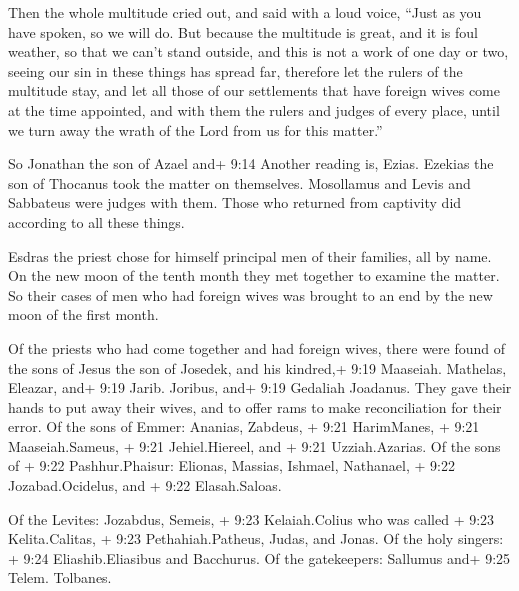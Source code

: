  Then the whole multitude cried out, and said with a loud
voice, ``Just as you have spoken, so we will do.  But
because the multitude is great, and it is foul weather, so that we can't
stand outside, and this is not a work of one day or two, seeing our sin
in these things has spread far,  therefore let the rulers
of the multitude stay, and let all those of our settlements that have
foreign wives come at the time appointed,  and with them
the rulers and judges of every place, until we turn away the wrath of
the Lord from us for this matter.''

 So Jonathan the son of Azael and+ 9:14 Another reading is,
Ezias. Ezekias the son of Thocanus took the matter on themselves.
Mosollamus and Levis and Sabbateus were judges with them. 
Those who returned from captivity did according to all these things.

 Esdras the priest chose for himself principal men of their
families, all by name. On the new moon of the tenth month they met
together to examine the matter.  So their cases of men who
had foreign wives was brought to an end by the new moon of the first
month.

 Of the priests who had come together and had foreign
wives, there were found  of the sons of Jesus the son of
Josedek, and his kindred,+ 9:19 Maaseiah. Mathelas, Eleazar, and+ 9:19
Jarib. Joribus, and+ 9:19 Gedaliah Joadanus.  They gave
their hands to put away their wives, and to offer rams to make
reconciliation for their error.  Of the sons of Emmer:
Ananias, Zabdeus, + 9:21 HarimManes, + 9:21 Maaseiah.Sameus, + 9:21
Jehiel.Hiereel, and + 9:21 Uzziah.Azarias.  Of the sons of
+ 9:22 Pashhur.Phaisur: Elionas, Massias, Ishmael, Nathanael, + 9:22
Jozabad.Ocidelus, and + 9:22 Elasah.Saloas.

 Of the Levites: Jozabdus, Semeis, + 9:23 Kelaiah.Colius
who was called + 9:23 Kelita.Calitas, + 9:23 Pethahiah.Patheus, Judas,
and Jonas.  Of the holy singers: + 9:24 Eliashib.Eliasibus
and Bacchurus.  Of the gatekeepers: Sallumus and+ 9:25
Telem. Tolbanes.

